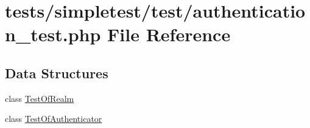 \hypertarget{authentication__test_8php}{\section{tests/simpletest/test/authentication\-\_\-test.php File Reference}
\label{authentication__test_8php}
}
\subsection*{Data Structures}
\begin{DoxyCompactItemize}
\item 
class \hyperlink{class_test_of_realm}{Test\-Of\-Realm}
\item 
class \hyperlink{class_test_of_authenticator}{Test\-Of\-Authenticator}
\end{DoxyCompactItemize}
